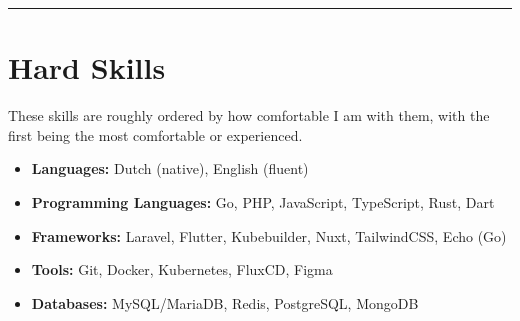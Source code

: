 \documentclass{article}
\begin{document}
\noindent\rule{\linewidth}{0.4pt}

\section*{Hard Skills}
These skills are roughly ordered by how comfortable I am with them, with the first being the most comfortable or experienced.
\begin{itemize}[noitemsep]
    \item \textbf{Languages:} Dutch (native), English (fluent)
    \item \textbf{Programming Languages:} Go, PHP, JavaScript, TypeScript, Rust, Dart
    \item \textbf{Frameworks:} Laravel, Flutter, Kubebuilder, Nuxt, TailwindCSS, Echo (Go)
    \item \textbf{Tools:} Git, Docker, Kubernetes, FluxCD, Figma
    \item \textbf{Databases:} MySQL/MariaDB, Redis, PostgreSQL, MongoDB
\end{itemize}
\end{document}
